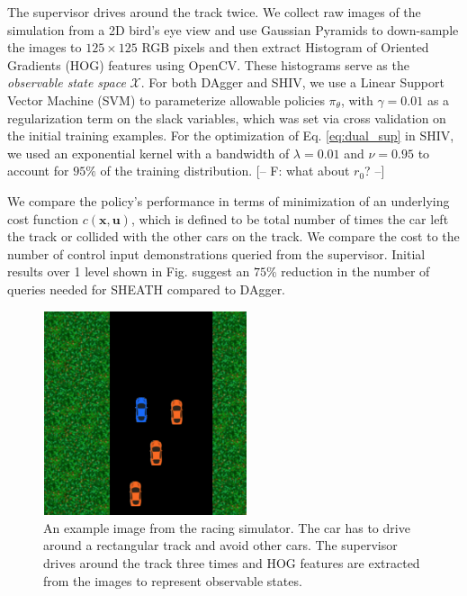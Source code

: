 \documentclass[10pt, conference]{ieeeconf}      %
\newcommand{\bu}{\mathbf{u}}
\newcommand{\bx}{\mathbf{x}}
\newcommand{\acro}{SHIV}
\begin{document}
The supervisor drives around the track twice. We collect raw images of the simulation from a 2D bird's eye view
and use Gaussian Pyramids to down-sample the images to $125 \times 125$ RGB pixels and then extract Histogram of
Oriented Gradients (HOG) features using OpenCV. These histograms serve as the \emph{observable state space}
$\mathcal{X}$. For both DAgger and \acro, we use a Linear Support Vector Machine (SVM) to parameterize allowable
policies $\pi_{\theta}$, with $\gamma=0.01$ as a regularization term on the slack variables, which was set via cross
validation on the initial training examples. For the optimization of Eq. \ref{eq:dual_sup} in \acro, we used an
exponential kernel with a bandwidth of $\lambda=0.01$ and $\nu = 0.95$ to account for $95\%$ of the training distribution. 
{\color{blue} [-- F: what about $r_0$? --]}

We compare the policy's performance in terms of minimization of an underlying cost function $c(\bx,\bu)$, which is
defined to be total number of times the car left the track or collided with the other cars on the track. We compare the
cost to the number of control input demonstrations queried from the supervisor. Initial results over 1 level shown in Fig.  suggest an $75\%$ reduction in the number of queries needed for SHEATH compared to DAgger. 

\begin{figure}[t!]
\centering
\includegraphics[width=6cm, height=6cm]{figures/race_car_track_example.png}
\caption{ An example image from the racing simulator. The car has to drive around a rectangular track and avoid other
cars. The supervisor drives around the track three times and HOG features are extracted from the images to represent
observable states.  }

\vspace*{-10pt}
\label{fig:race_car}
\end{figure}
\end{document}
